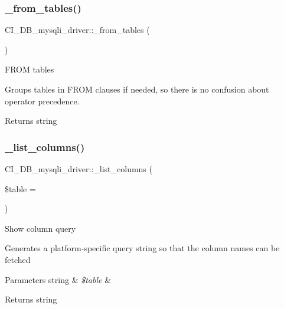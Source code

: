 \subsubsection{\texorpdfstring{\+\_\+from\+\_\+tables()}{\_from\_tables()}}
{\footnotesize\ttfamily C\+I\+\_\+\+D\+B\+\_\+mysqli\+\_\+driver\+::\+\_\+from\+\_\+tables (\begin{DoxyParamCaption}{ }\end{DoxyParamCaption})\hspace{0.3cm}{\ttfamily [protected]}}

F\+R\+OM tables

Groups tables in F\+R\+OM clauses if needed, so there is no confusion about operator precedence.

\begin{DoxyReturn}{Returns}
string 
\end{DoxyReturn}
\mbox{\label{class_c_i___d_b__mysqli__driver_aaa362bea9155e864b77cb3fff47282fb}} 
\subsubsection{\texorpdfstring{\+\_\+list\+\_\+columns()}{\_list\_columns()}}
{\footnotesize\ttfamily C\+I\+\_\+\+D\+B\+\_\+mysqli\+\_\+driver\+::\+\_\+list\+\_\+columns (\begin{DoxyParamCaption}\item[{}]{\$table = {\ttfamily \textquotesingle{}\textquotesingle{}} }\end{DoxyParamCaption})\hspace{0.3cm}{\ttfamily [protected]}}

Show column query

Generates a platform-\/specific query string so that the column names can be fetched


\begin{DoxyParams}[1]{Parameters}
string & {\em \$table} & \\
\hline
\end{DoxyParams}
\begin{DoxyReturn}{Returns}
string 
\end{DoxyReturn}
\mbox{\label{class_c_i___d_b__mysqli__driver_aa929322523ded7aa09ddaad77fd3906f}} 
